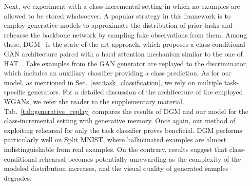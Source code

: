 \documentclass[10pt,twocolumn,letterpaper]{article}
\begin{document}
\label{sec:generative_memory}
Next, we experiment with a class-incremental setting in which no examples are allowed to be stored whatsoever. A popular strategy in this framework is to employ generative models to approximate the distribution of prior tasks and rehearse the backbone network by sampling fake observations from them. Among these, DGM~\cite{ostapenko2019learning} is the state-of-the-art approach, which proposes a class-conditional GAN architecture paired with a hard attention mechanism similar to the one of HAT~\cite{hat}. Fake examples from the GAN generator are replayed to the discriminator, which includes an auxiliary classifier providing a class prediction. As for our model, as mentioned in Sec.~\ref{sec:task_classification}, we rely on multiple task-specific generators.
For a detailed discussion of the architecture of the employed WGANs, we refer the reader to the supplementary material.
Tab.~\ref{tab:generative_replay} compares the results of DGM and our model for the class-incremental setting with generative memory. Once again, our method of exploiting rehearsal for only the task classifier proves beneficial. DGM performs particularly well on Split MNIST, where hallucinated examples are almost indistinguishable from real examples. On the contrary, results suggest that class-conditional rehearsal becomes potentially unrewarding as the complexity of the modeled distribution increases, and the visual quality of generated samples degrades.
\end{document}
